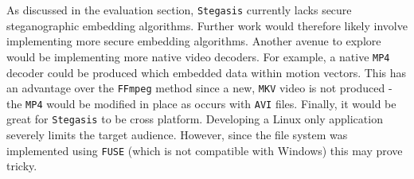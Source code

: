 \documentclass[paper=a4, fontsize=11pt,twoside]{scrartcl}
\numberwithin{table}{section}
\numberwithin{figure}{section}
\numberwithin{algorithm}{section}
\begin{document}
As discussed in the evaluation section, \texttt{Stegasis} currently lacks secure steganographic embedding algorithms. Further work would therefore likely involve implementing more secure embedding algorithms. Another avenue to explore would be implementing more native video decoders. For example, a native \texttt{MP4} decoder could be produced which embedded data within motion vectors. This has an advantage over the \texttt{FFmpeg} method since a new, \texttt{MKV} video is not produced - the \texttt{MP4} would be modified in place as occurs with \texttt{AVI} files.
Finally, it would be great for \texttt{Stegasis} to be cross platform. Developing a Linux only application severely limits the target audience. However, since the file system was implemented using \texttt{FUSE} (which is not compatible with Windows) this may prove tricky.

\vfill

\pagebreak
\end{document}
